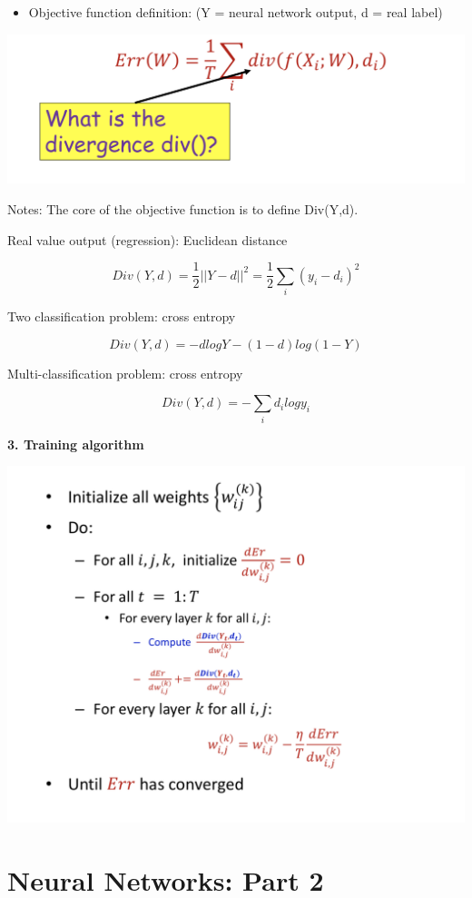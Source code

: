 \documentclass{article}
\begin{document}
	\begin{itemize}
		\item Objective function definition: (Y = neural network output, d = real label)
	\end{itemize}
	
	
	\includegraphics[scale=0.2]{64.png}
	
	Notes: The core of the objective function is to define Div(Y,d).
	
	Real value output (regression): Euclidean distance
	
	$$Div(Y,d)=\frac{1}{2}||Y-d||^2=\frac{1}{2}\sum _i(y_i-d_i)^2$$
	
	Two classification problem: cross entropy
	
	$$Div(Y,d)=-dlogY-(1-d)log(1-Y)$$
	
	Multi-classification problem: cross entropy
	
	$$Div(Y,d)=-\sum _id_ilogy_i$$
	
	\textbf{3. Training algorithm}
	
	\includegraphics[scale=0.2]{65.png}
	
	
	\section{Neural Networks: Part 2}
	
\end{document}
